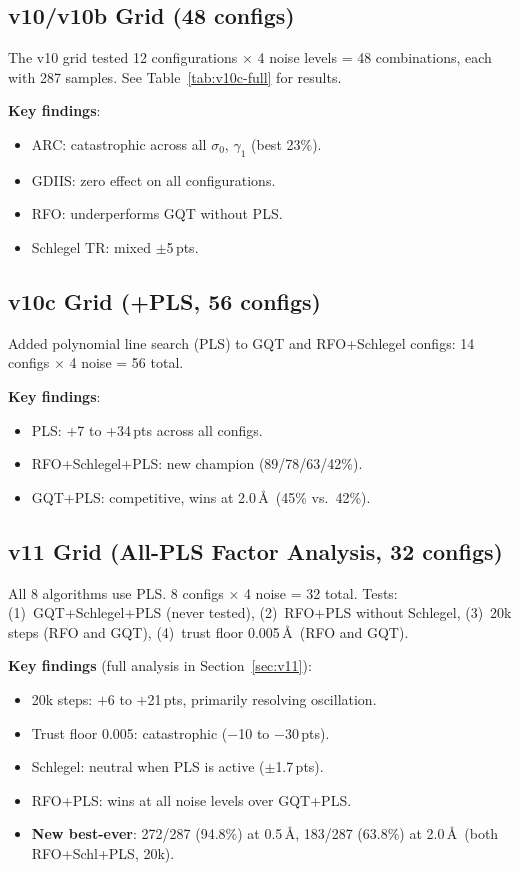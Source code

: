 \documentclass[11pt,a4paper]{article}
\theoremstyle{definition}
\begin{document}
\subsection{v10/v10b Grid (48 configs)}

The v10 grid tested 12 configurations $\times$ 4 noise levels = 48
combinations, each with 287 samples.  See Table~\ref{tab:v10c-full}
for results.

\textbf{Key findings}:
\begin{itemize}[nosep]
  \item ARC: catastrophic across all $\sigma_0$, $\gamma_1$ (best 23\%).
  \item GDIIS: zero effect on all configurations.
  \item RFO: underperforms GQT without PLS.
  \item Schlegel TR: mixed $\pm$5\,pts.
\end{itemize}

\subsection{v10c Grid (+PLS, 56 configs)}

Added polynomial line search (PLS) to GQT and RFO+Schlegel configs:
14 configs $\times$ 4 noise = 56 total.

\textbf{Key findings}:
\begin{itemize}[nosep]
  \item PLS: +7 to +34\,pts across all configs.
  \item RFO+Schlegel+PLS: new champion (89/78/63/42\%).
  \item GQT+PLS: competitive, wins at 2.0\,\AA\ (45\% vs.\ 42\%).
\end{itemize}

\subsection{v11 Grid (All-PLS Factor Analysis, 32 configs)}

All 8 algorithms use PLS.  8 configs $\times$ 4 noise = 32 total.
Tests: (1)~GQT+Schlegel+PLS (never tested), (2)~RFO+PLS without Schlegel,
(3)~20k steps (RFO and GQT), (4)~trust floor 0.005\,\AA\ (RFO and GQT).

\textbf{Key findings} (full analysis in Section~\ref{sec:v11}):
\begin{itemize}[nosep]
  \item 20k steps: $+$6 to $+$21\,pts, primarily resolving oscillation.
  \item Trust floor 0.005: catastrophic ($-$10 to $-$30\,pts).
  \item Schlegel: neutral when PLS is active ($\pm$1.7\,pts).
  \item RFO+PLS: wins at all noise levels over GQT+PLS.
  \item \textbf{New best-ever}: 272/287 (94.8\%) at 0.5\,\AA, 183/287
    (63.8\%) at 2.0\,\AA\ (both RFO+Schl+PLS, 20k).
\end{itemize}
\end{document}
